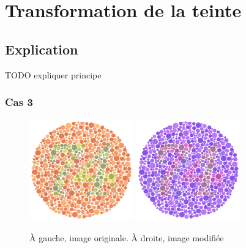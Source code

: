 \documentclass[a4paper]{article}
\begin{document}
\clearpage

\section{Transformation de la teinte}

\subsection{Explication}

TODO expliquer principe

\subsubsection{Cas 3}

\begin{figure}[H]
\begin{center}
\includegraphics[width=170px]{../base/cas_3_dalton74.png}
\includegraphics[width=170px]{../base/cas_3_dalton74_question3_1.png}
\end{center}
\caption{À gauche, image originale. À droite, image modifiée}
\end{figure}
\end{document}
